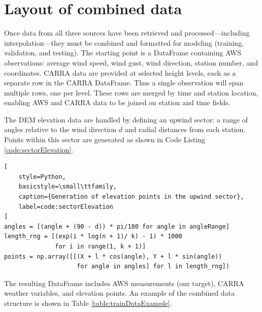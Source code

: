 \section{Layout of combined data}\label{sec:layout}

Once data from all three sources have been retrieved and processed—including interpolation—they must be combined and formatted for modeling (training, validation, and testing). The starting point is a DataFrame containing AWS observations: average wind speed, wind gust, wind direction, station number, and coordinates. CARRA data are provided at selected height levels, each as a separate row in the CARRA DataFrame. Thus a single observation will span multiple rows, one per level. These rows are merged by time and station location, enabling AWS and CARRA data to be joined on station and time fields.

The DEM elevation data are handled by defining an upwind sector: a range of angles relative to the wind direction $d$ and radial distances from each station. Points within this sector are generated as shown in Code Listing \ref{code:sectorElevation}.

\begin{lstlisting}[
    style=Python,
    basicstyle=\small\ttfamily,
    caption={Generation of elevation points in the upwind sector},
    label=code:sectorElevation
]
angles = [(angle + (90 - d)) * pi/180 for angle in angleRange]
length_rng = [(exp(i * log(n + 1)/ k) - 1) * 1000 
              for i in range(1, k + 1)]
points = np.array([[(X + l * cos(angle), Y + l * sin(angle))
                    for angle in angles] for l in length_rng])   
\end{lstlisting}

The resulting DataFrame includes AWS measurements (our target), CARRA weather variables, and elevation points. An example of the combined data structure is shown in Table \ref{table:trainDataExample}.

\begin{table}[h]
    \centering
    \caption[Example of combined data structure]{Example of the combined data structure of features used for modeling. Data include derived variables Richardson number (Ri) and squared Brunt–Väisälä frequency ($N^2$), station altitude (meters above sea level), transformed wind direction (twd), wind speed (ws$_{15}$), wind direction (wd$_{15}$), temperature ($t_{15}$), pressure ($p_{15}$) (CARRA values at 15 m height), and elevation points (from DEM) in a sector pointing upwind.}
    \label{table:trainDataExample}
\end{table}

